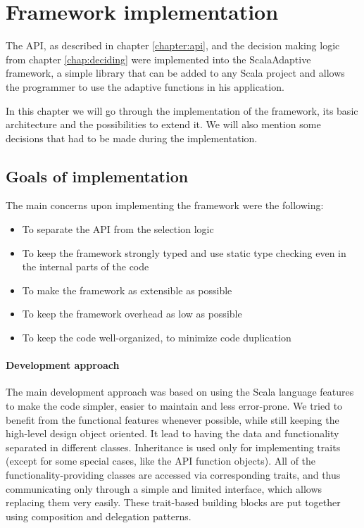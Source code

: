 \chapter{Framework implementation}
\label{chap:implementation}

The API, as described in chapter \ref{chapter:api}, and the decision making logic from chapter \ref{chap:deciding} were implemented into the ScalaAdaptive framework, a simple library that can be added to any Scala project and allows the programmer to use the adaptive functions in his application.

In this chapter we will go through the implementation of the framework, its basic architecture and the possibilities to extend it. We will also mention some decisions that had to be made during the implementation.

\section{Goals of implementation}

The main concerns upon implementing the framework were the following:

\begin{itemize}
	\item To separate the API from the selection logic
	\item To keep the framework strongly typed and use static type checking even in the internal parts of the code
	\item To make the framework as extensible as possible
	\item To keep the framework overhead as low as possible
	\item To keep the code well-organized, to minimize code duplication
\end{itemize}

\subsubsection{Development approach}

The main development approach was based on using the Scala language features to make the code simpler, easier to maintain and less error-prone. We tried to benefit from the functional features whenever possible, while still keeping the high-level design object oriented. It lead to having the data and functionality separated in different classes. Inheritance is used only for implementing traits (except for some special cases, like the API function objects). All of the functionality-providing classes are accessed via corresponding traits, and thus communicating only through a simple and limited interface, which allows replacing them very easily. These trait-based building blocks are put together using composition and delegation patterns.

